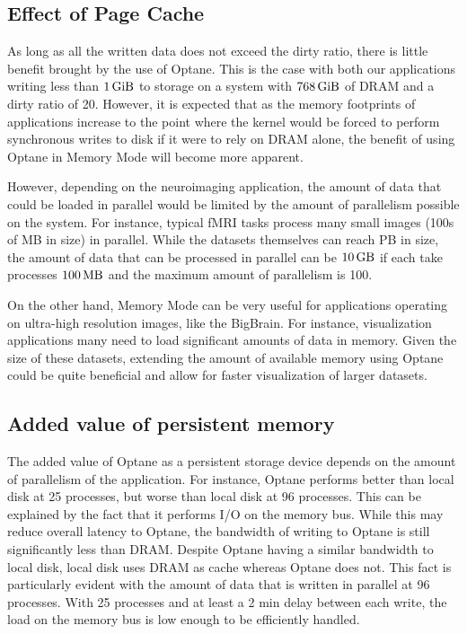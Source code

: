 \documentclass[conference]{IEEEtran}
\newcommand{\bigbrain}{BigBrain\xspace}
\begin{document}
\subsection{Effect of Page Cache}

As long as all the written data does not exceed the dirty ratio, there is little 
benefit brought by the use of Optane. This is the case with both
our applications writing less than $\SI{1}{\gibi\byte}$ to storage on a system with 
$\SI{768}{\gibi\byte}$ of DRAM and a dirty ratio of 20. However, it is expected 
that as the memory footprints of applications increase to the point where the kernel
would be forced to perform synchronous writes to disk if it were to rely on DRAM alone,
the benefit of using Optane in Memory Mode will become more apparent. 

However, depending on the neuroimaging application, the amount of data that could be
loaded in parallel would be limited by the amount of parallelism possible on the system.
For instance, typical fMRI tasks process many small images (100s of MB in size) in parallel.
While the datasets themselves can reach PB in size, the amount of data that can be processed in
parallel can be $\SI{10}{\giga\byte}$ if each take processes $\SI{100}{\mega\byte}$ and the 
maximum amount of parallelism is 100. 

On the other hand, Memory Mode can be very useful for applications operating on
ultra-high resolution images, like the \bigbrain. For instance, visualization applications
many need to load significant amounts of data in memory. Given the size of these datasets, 
extending the amount of available memory using Optane could be quite beneficial and allow
for faster visualization of larger datasets.


\subsection{Added value of persistent memory}

The added value of Optane as a persistent storage device depends on the amount of parallelism
of the application. For instance, Optane performs better than local disk at 25 processes,
but worse than local disk at 96 processes. This can be explained by the fact that it performs
I/O on the memory bus. While this may reduce overall latency to Optane, the bandwidth of 
writing to Optane is still significantly less than DRAM. Despite Optane having a similar bandwidth
to local disk, local disk uses DRAM as cache whereas Optane does not. This fact is 
particularly evident with the amount of data that is written in parallel at 96 processes. With 25 processes
and at least a 2 min
delay between each write, the load on the memory bus is low enough to be efficiently handled.
\end{document}
